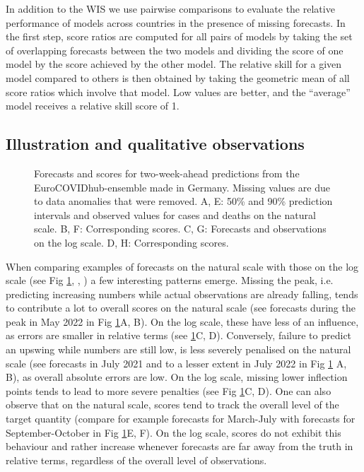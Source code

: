 \documentclass[10pt,letterpaper]{article}
\begin{document}
In addition to the WIS we use pairwise comparisons \cite{cramerEvaluationIndividualEnsemble2021} to evaluate the relative performance of models across countries in the presence of missing forecasts. In the first step, score ratios are computed for all pairs of models by taking the set of overlapping forecasts between the two models and dividing the score of one model by the score achieved by the other model. The relative skill for a given model compared to others is then obtained by taking the geometric mean of all score ratios which involve that model. Low values are better, and the ``average'' model receives a relative skill score of 1. 


\subsection*{Illustration and qualitative observations}

\begin{figure}[h!]
    \centering
    \caption{
    Forecasts and scores for two-week-ahead predictions from the EuroCOVIDhub-ensemble made in Germany. Missing values are due to data anomalies that were removed. 
    A, E: 50\% and 90\% prediction intervals and observed values for cases and deaths on the natural scale. B, F: Corresponding scores. C, G: Forecasts and observations on the log scale. D, H: Corresponding scores. 
    }
    \label{fig:HUB-model-comparison-ensemble}
\end{figure}

When comparing examples of forecasts on the natural scale with those on the log scale (see Fig \ref{fig:HUB-model-comparison-ensemble}, , ) a few interesting patterns emerge. Missing the peak, i.e. predicting increasing numbers while actual observations are already falling, tends to contribute a lot to overall scores on the natural scale (see forecasts during the peak in May 2022 in Fig \ref{fig:HUB-model-comparison-ensemble}A, B). On the log scale, these have less of an influence, as errors are smaller in relative terms (see \ref{fig:HUB-model-comparison-ensemble}C, D). Conversely, failure to predict an upswing while numbers are still low, is less severely penalised on the natural scale (see forecasts in July 2021 and to a lesser extent in July 2022 in Fig \ref{fig:HUB-model-comparison-ensemble} A, B), as overall absolute errors are low. On the log scale, missing lower inflection points tends to lead to more severe penalties (see Fig \ref{fig:HUB-model-comparison-ensemble}C, D). One can also observe that on the natural scale, scores tend to track the overall level of the target quantity (compare for example forecasts for March-July with forecasts for September-October in Fig \ref{fig:HUB-model-comparison-ensemble}E, F). On the log scale, scores do not exhibit this behaviour and rather increase whenever forecasts are far away from the truth in relative terms, regardless of the overall level of observations. 
\end{document}
